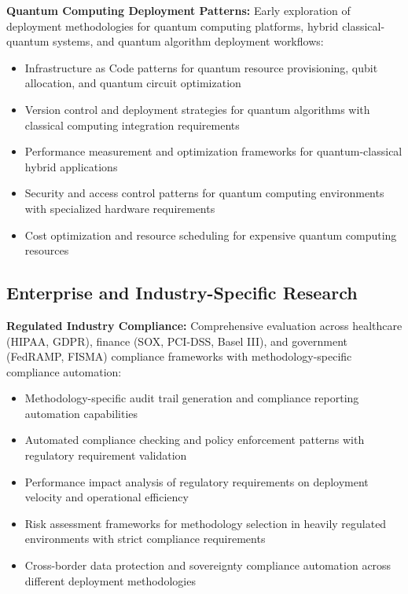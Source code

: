 \textbf{Quantum Computing Deployment Patterns:} Early exploration of deployment methodologies for quantum computing platforms, hybrid classical-quantum systems, and quantum algorithm deployment workflows:
\begin{itemize}
\item Infrastructure as Code patterns for quantum resource provisioning, qubit allocation, and quantum circuit optimization
\item Version control and deployment strategies for quantum algorithms with classical computing integration requirements
\item Performance measurement and optimization frameworks for quantum-classical hybrid applications
\item Security and access control patterns for quantum computing environments with specialized hardware requirements
\item Cost optimization and resource scheduling for expensive quantum computing resources
\end{itemize}

\subsection{Enterprise and Industry-Specific Research}
\label{subsec:enterprise_research}

\textbf{Regulated Industry Compliance:} Comprehensive evaluation across healthcare (HIPAA, GDPR), finance (SOX, PCI-DSS, Basel III), and government (FedRAMP, FISMA) compliance frameworks with methodology-specific compliance automation:
\begin{itemize}
\item Methodology-specific audit trail generation and compliance reporting automation capabilities
\item Automated compliance checking and policy enforcement patterns with regulatory requirement validation
\item Performance impact analysis of regulatory requirements on deployment velocity and operational efficiency
\item Risk assessment frameworks for methodology selection in heavily regulated environments with strict compliance requirements
\item Cross-border data protection and sovereignty compliance automation across different deployment methodologies
\end{itemize}

